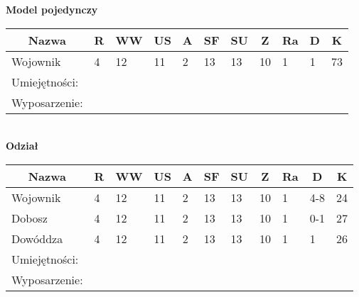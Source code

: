 \textbf{Model pojedynczy}

\begin{tabular}{|l|l|l|l|l|l|l|l|l|l|l|}
\hline
\multicolumn{1}{c}{Nazwa} & \multicolumn{1}{c}{R} & \multicolumn{1}{c}{WW} & \multicolumn{1}{c}{US} & \multicolumn{1}{c}{A} & \multicolumn{1}{c}{SF} & \multicolumn{1}{c}{SU} & \multicolumn{1}{c}{Z} & \multicolumn{1}{c}{Ra} & \multicolumn{1}{c}{D} & \multicolumn{1}{c}{K} \\ \hline
Wojownik & 4 & 12 & 11 & 2 & 13 & 13 & 10 & 1 & 1 & 73 \\ \hline
Umiejętności: \\ \hline
Wyposarzenie: \\ \hline
\end{tabular}

\hfill\\

\textbf{Odział}

\begin{tabular}{|l|l|l|l|l|l|l|l|l|l|l|}
\hline
\multicolumn{1}{c}{Nazwa} & \multicolumn{1}{c}{R} & \multicolumn{1}{c}{WW} & \multicolumn{1}{c}{US} & \multicolumn{1}{c}{A} & \multicolumn{1}{c}{SF} & \multicolumn{1}{c}{SU} & \multicolumn{1}{c}{Z} & \multicolumn{1}{c}{Ra} & \multicolumn{1}{c}{D} & \multicolumn{1}{c}{K} \\ \hline
Wojownik & 4 & 12 & 11 & 2 & 13 & 13 & 10 & 1 & 4-8 & 24  \\ \hline
Dobosz & 4 & 12 & 11 & 2 & 13 & 13 & 10 & 1 & 0-1 & 27 \\ \hline
Dowóddza & 4 & 12 & 11 & 2 & 13 & 13 & 10 & 1 & 1 & 26 \\ \hline
Umiejętności: \\ \hline
Wyposarzenie: \\ \hline
\end{tabular}


